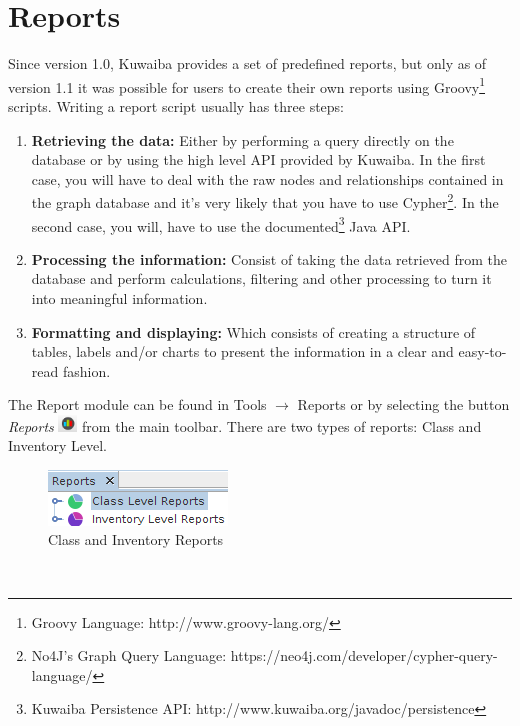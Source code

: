 \documentclass[a4paper]{article}
\begin{document}
		\section{Reports}
		Since version 1.0, Kuwaiba provides a set of predefined reports, but only as of version 1.1 it was possible for users to create their own reports using Groovy\footnote{Groovy Language: http://www.groovy-lang.org/} scripts. Writing a report script usually has three steps:
		\begin{enumerate}
			\item \textbf{Retrieving the data:} Either by performing a query directly on the database or by using the high level API provided by Kuwaiba. In the first case, you will have to deal with the raw nodes and relationships contained in the graph database and it's very likely that you have to use Cypher\footnote{No4J's Graph Query Language: https://neo4j.com/developer/cypher-query-language/}. In the second case, you will, have to use the documented\footnote{Kuwaiba Persistence API: http://www.kuwaiba.org/javadoc/persistence} Java API.
			\item \textbf{Processing the information:} Consist of taking the data retrieved from the database and perform calculations, filtering and other processing to turn it into meaningful information.
			\item \textbf{Formatting and displaying:} Which consists of creating a structure of tables, labels and/or charts to present the information in a clear and easy-to-read fashion.
		\end{enumerate}
		The Report module can be found in Tools $\rightarrow$ Reports or by selecting the button \textit{Reports} \includegraphics[width=0.5cm]{img/icon_reports.png} from the main toolbar.  There are two types of reports: Class and Inventory Level.
		\begin{figure}[h!]
			\centering
			\includegraphics[scale=0.8]{img/reports_report_types.png}
			\caption{Class and Inventory Reports}
			\label{fig:reports_report_types}
		\end{figure}\\
\end{document}
